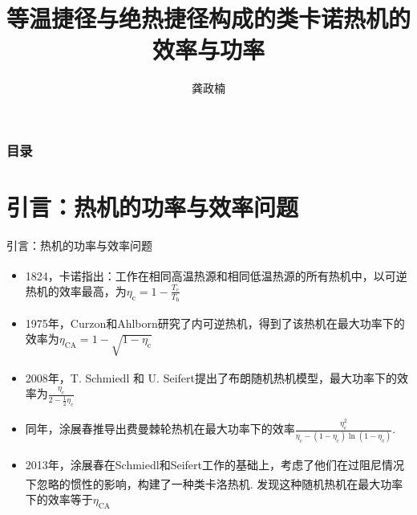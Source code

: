 \documentclass{beamer}
\title{等温捷径与绝热捷径构成的类卡诺热机的效率与功率}
\author{龚政楠}
\institute{北京师范大学}
\newcommand{\upcite}[1]{\textsuperscript{\cite{#1}}}  %
\begin{document}
\begin{frame} %
\titlepage
\end{frame}

\begin{frame}           %
        \addtocounter{framenumber}{-2}%
        \frametitle{目录}
        \tableofcontents 
\end{frame}

\section{引言：热机的功率与效率问题}


\begin{frame}{引言：热机的功率与效率问题}
    \begin{itemize}
        \item<2-> 1824，卡诺指出\upcite{2005}：工作在相同高温热源和相同低温热源的所有热机中，以可逆热机的效率最高，为$\eta _{\mathrm{c}}=1-\frac{T_\mathrm{c}}{T_\mathrm{h}}$ 
        \item<3-> 1975年，Curzon和Ahlborn研究了内可逆热机\upcite{Curzon1975}，得到了该热机在最大功率下的效率为$\eta _{\mathrm{CA}}=1-\sqrt{1-\eta _{\mathrm{c}}}$
        \item<4-> 2008年，T. Schmiedl 和 U. Seifert提出了布朗随机热机模型\upcite{Schmiedl2008}，最大功率下的效率为$\frac{ \eta_{\mathrm{c}}}{2-\frac{1}{2}\eta_{\mathrm{c}}}$
        \item<5-> 同年，涂展春推导出费曼棘轮热机\upcite{Tu2008}在最大功率下的效率$\frac{\eta _{\mathrm{c}}^{2}}{\eta _{\mathrm{c}}-\left( 1-\eta _{\mathrm{c}} \right) \ln \left( 1-\eta _{\mathrm{c}} \right)}$. \upcite{Tu2020}
        \item<6-> 2013年，涂展春在Schmiedl和Seifert工作\upcite{Schmiedl2008}的基础上，考虑了他们在过阻尼情况下忽略的惯性的影响，构建了一种类卡洛热机\upcite{Tu2013}. 发现这种随机热机在最大功率下的效率等于$\eta _{\mathrm{CA}}$
    \end{itemize}    
\end{frame}
\end{document}
